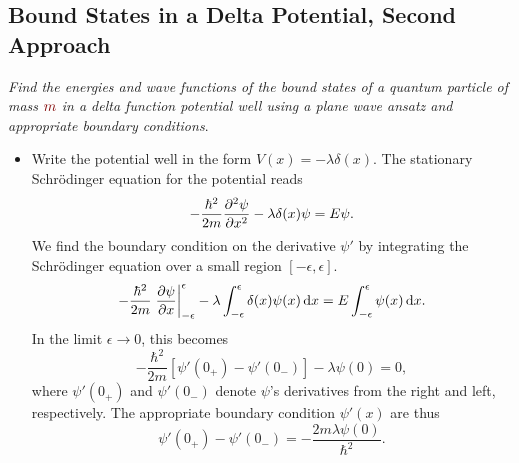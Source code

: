 \documentclass[11pt, a4paper]{article}
\newcommand{\dmath}[1]{\textcolor{Maroon}{#1}}  %
\newcommand{\diff}{\mathop{}\!\mathrm{d}} %
\newcommand{\Schro}{Schr\"{o}dinger\xspace}
\begin{document}
\subsection{Bound States in a Delta Potential, Second Approach}
\textit{Find the energies and wave functions of the bound states of a quantum particle of mass $ \dmath{m} $ in a delta function potential well using a plane wave ansatz and appropriate boundary conditions}. 
\begin{itemize}
	\item Write the potential well in the form $ V(x) = - \lambda \delta (x) $. The stationary \Schro equation for the potential reads
	\begin{equation*}
		- \frac{\hbar^{2}}{2m}\pdv[2]{\psi}{x} - \lambda \delta(x) \psi = E\psi.
	\end{equation*}
	We find the boundary condition on the derivative $ \psi' $ by integrating the \Schro equation over a small region $ [-\epsilon, \epsilon] $. 
	\begin{equation*}
		-\frac{\hbar^{2}}{2m} \eval{\pdv{\psi}{x}}_{-\epsilon}^{\epsilon} - \lambda \int_{-\epsilon}^{\epsilon} \delta(x) \psi(x)\diff x = E \int_{-\epsilon}^{\epsilon}\psi(x) \diff x.
	\end{equation*}
	In the limit $ \epsilon \to 0 $, this becomes
	\begin{equation*}
		-\frac{\hbar^{2}}{2m} \left[\psi'(0_{+}) - \psi'(0_{-})\right] - \lambda \psi(0) = 0,
	\end{equation*}
	where $ \psi'(0_{+}) $ and $ \psi'(0_{-}) $ denote $ \psi $'s derivatives from the right and left, respectively. The appropriate boundary condition $ \psi'(x) $ are thus
	\begin{equation*}
		\psi'(0_{+}) - \psi'(0_{-}) = -\frac{2m\lambda\psi(0)}{\hbar^{2}}.
	\end{equation*}
	

\end{itemize}
\end{document}

